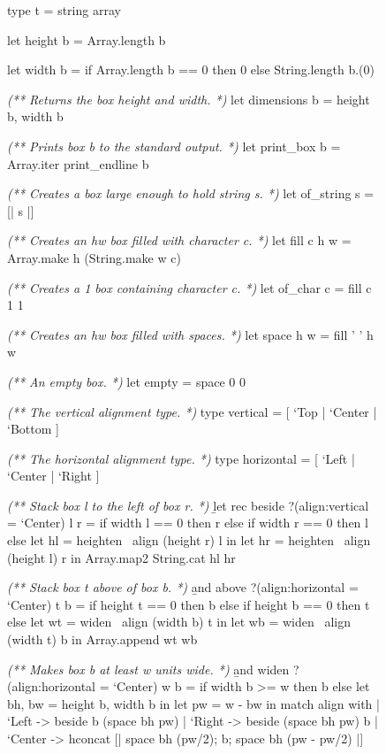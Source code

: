 \documentclass{article}
\begin{document}
\begin{figure}

\begin{code}[ocaml]
type t = string array

let height b = Array.length b\label{ref-height}

let width b = if Array.length b == 0 then 0 else String.length b.(0)\label{ref-width}

\emph{(** Returns the box height and width. *)}
let dimensions b = height b, width b

\emph{(** Prints box b to the standard output. *)}
let print_box b = Array.iter print_endline b\label{ref-print-box}

\emph{(** Creates a box large enough to hold string s. *)}
let of_string s = [| s |]\label{ref-of-string}

\emph{(** Creates an h\times w box filled with character c. *)}
let fill c h w = Array.make h (String.make w c)\label{ref-fill}

\emph{(** Creates a 1 box containing character c. *)}
let of_char c = fill c 1 1\label{ref-of-char}

\emph{(** Creates an h\times w box filled with spaces. *)}
let space h w = fill ' ' h w\label{ref-space}

\emph{(** An empty box. *)}
let empty = space 0 0\label{ref-empty}

\emph{(** The vertical alignment type. *)}
type vertical   = [ `Top  | `Center | `Bottom ]

\emph{(** The horizontal alignment type. *)}
type horizontal = [ `Left | `Center | `Right  ]

\emph{(** Stack box l to the left of box r. *)}
\b{let rec} beside ?(align:vertical = `Center) l r =\label{ref-beside}
    if width l == 0 then r else if width r == 0 then l
    else let hl = heighten ~align (height r) l in
         let hr = heighten ~align (height l) r in
         Array.map2 String.cat hl hr

\emph{(** Stack box t above of box b. *)}
\b{and} above ?(align:horizontal = `Center) t b =\label{ref-above}
    if height t == 0 then b else if height b == 0 then t
    else let wt = widen ~align (width b) t in
         let wb = widen ~align (width t) b in
         Array.append wt wb

\emph{(** Makes box b at least w units wide. *)}
\b{and} widen ?(align:horizontal = `Center) w b =\label{ref-widen}
    if width b >= w then b
    else let bh, bw = height b, width b in
         let pw = w - bw in
         match align with
         | `Left   -> beside b (space bh pw)
         | `Right  -> beside (space bh pw) b
         | `Center -> hconcat
                      [| space bh (pw/2); b; space bh (pw - pw/2) |]


\end{code}
\end{figure}
\end{document}
